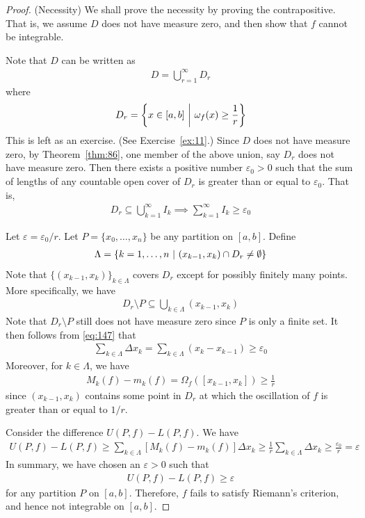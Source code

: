 \documentclass[thmcnt=section, 12pt]{my-elegantbook}
\begin{document}
\begin{proof}
	(Necessity) We shall prove the necessity by proving the contrapositive.
	That is, we assume $D$ does not have measure zero, 
	and then show that $f$ cannot be integrable.

	Note that $D$ can be written as 
	\begin{align*}
		D = \bigcup_{r=1}^\infty D_r
	\end{align*}
	where
	\begin{align*}
		D_r = \left\{ x \in [a, b] \ \middle| \ \omega_f(x) \geq \frac{1}{r} \right\}
	\end{align*}
	This is left as an exercise. (See Exercise~\ref{ex:11}.)
	Since $D$ does not have measure zero,
	by Theorem~\ref{thm:86},
	one member of the above union, say $D_r$ 
	does not have measure zero.
	Then there exists a positive number $\varepsilon_0 > 0$
	such that the sum of lengths of any countable open cover of $D_r$
	is greater than or equal to $\varepsilon_0$.
	That is, 
	\begin{align}
		D_r \subseteq \bigcup_{k=1}^\infty I_k
		\implies \sum_{k=1}^\infty I_k \geq \varepsilon_0
		\label{eq:147}
	\end{align}

	Let $\varepsilon = \varepsilon_0 / r$.
	Let $P = \{x_0, \ldots, x_n\}$ be any partition on $[a, b]$. 
	Define
	\begin{align*}
		\Lambda 
		= \left\{ k=1, \ldots, n \ \middle| \ (x_{k-1}, x_k) \cap D_r \neq \emptyset \right\}
	\end{align*}
	Note that $\{(x_{k-1}, x_k)\}_{k \in \Lambda}$ covers $D_r$
	except for possibly finitely many points.
	More specifically, we have 
	\begin{align*}
		D_r \setminus P \subseteq \bigcup_{k \in \Lambda} (x_{k-1}, x_k)
	\end{align*}
	Note that $D_r \setminus P$ still does not have measure zero
	since $P$ is only a finite set.
	It then follows from \eqref{eq:147} that 
	\begin{align*}
		\sum_{k \in \Lambda} \Delta x_k
		= \sum_{k \in \Lambda} (x_k - x_{k-1}) 
		\geq \varepsilon_0
	\end{align*}
	Moreover, for $k \in \Lambda$, we have 
	\begin{align*}
		M_k(f) - m_k(f)
		= \Omega_f([x_{k-1}, x_k])
		\geq \frac{1}{r}
	\end{align*}
	since $(x_{k-1}, x_k)$ contains some point in $D_r$ at which 
	the oscillation of $f$ is greater than or equal to $1 / r$.

	Consider the difference $U(P,f) - L(P,f)$.
	We have 
	\begin{align*}
		U(P,f) - L(P,f)
		\geq \sum_{k \in \Lambda} [M_k(f) - m_k(f)] \Delta x_k
		\geq \frac{1}{r} \sum_{k \in \Lambda} \Delta x_k
		\geq \frac{\varepsilon_0}{r}
		= \varepsilon
	\end{align*}
	In summary, we have chosen an $\varepsilon > 0$ such that 
	\begin{align*}
		U(P,f) - L(P,f) \geq \varepsilon
	\end{align*}
	for any partition $P$ on $[a, b]$.
	Therefore, $f$ fails to satisfy Riemann's criterion, 
	and hence not integrable on $[a, b]$.


\end{proof}
\end{document}
